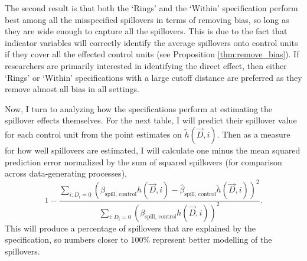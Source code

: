 \documentclass[11pt]{article}
\begin{document}
The second result is that both the `Rings' and the `Within' specification perform best among all the misspecified spillovers in terms of removing bias, so long as they are wide enough to capture all the spillovers. This is due to the fact that indicator variables will correctly identify the average spillovers onto control units if they cover all the effected control units (see Proposition \ref{thm:remove_bias}). If researchers are primarily interested in identifying the direct effect, then either `Rings' or `Within' specifications with a large cutoff distance are preferred as they remove almost all bias in all settings. 

Now, I turn to analyzing how the specifications perform at estimating the spillover effects themselves. For the next table, I will predict their spillover value for each control unit from the point estimates on $\tilde{h}(\vec{D}, i)$. Then as a measure for how well spillovers are estimated, I will calculate one minus the mean squared prediction error normalized by the sum of squared spillovers (for comparison across data-generating processes), \[ 
    1 - \frac{\sum_{i: D_i = 0} (\beta_{\text{spill, control}} h(\vec{D}, i) - \hat{\beta}_{\text{spill, control}} \tilde{h}(\vec{D}, i))^2}{\sum_{i: D_i = 0} (\beta_{\text{spill, control}} h(\vec{D}, i))^2}.
\] This will produce a percentage of spillovers that are explained by the specification, so numbers closer to $100\%$ represent better modelling of the spillovers. 
\end{document}
